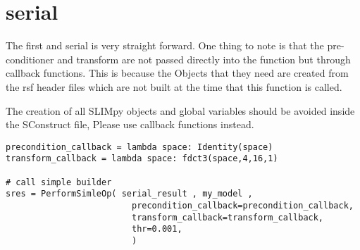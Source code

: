 \documentclass{manual}
\begin{document}
	\section{serial}
	The first and serial  is very straight forward. 
	One thing to note is that the pre-conditioner and transform are not passed directly into the function but 
	through callback functions. This is because the  Objects that they need are created from the rsf header files
	which are not built at the time that this function is called.

 \begin{notice} [warning] 
The creation of all SLIMpy objects and global variables should be avoided inside the SConstruct file, Please use callback functions instead. 
\end{notice}

\begin{verbatim}
precondition_callback = lambda space: Identity(space)
transform_callback = lambda space: fdct3(space,4,16,1)

# call simple builder
sres = PerformSimleOp( serial_result , my_model ,
                         precondition_callback=precondition_callback,
                         transform_callback=transform_callback,
                         thr=0.001,
                         )
\end{verbatim}
\end{document}
